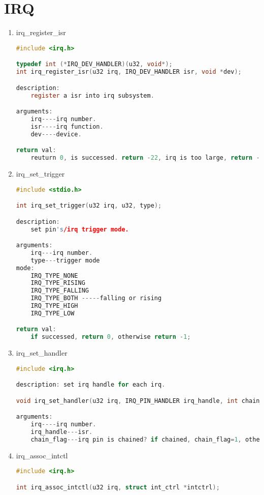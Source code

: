 \section{IRQ}
\begin{enumerate}
\item irq\_register\_isr
\begin{lstlisting}[language=c, numbers=none]
#include <irq.h>

typedef int (*IRQ_DEV_HANDLER)(u32, void*);
int irq_register_isr(u32 irq, IRQ_DEV_HANDLER isr, void *dev);

description:
	register a isr into irq subsystem.

arguments:
	irq----irq number.
	isr----irq function.
	dev----device.

return val:
	reuturn 0, is successed. return -22, irq is too large, return -12, is no memory.
\end{lstlisting}

\item irq\_set\_trigger
\begin{lstlisting}[language=c, numbers=none]
#include <stdio.h>

int irq_set_trigger(u32 irq, u32, type);

description:
	set pin's/irq trigger mode.

arguments:
	irq---irq number.
	type---trigger mode
mode:
	IRQ_TYPE_NONE
	IRQ_TYPE_RISING
	IRQ_TYPE_FALLING
	IRQ_TYPE_BOTH -----falling or rising
	IRQ_TYPE_HIGH
	IRQ_TYPE_LOW

return val:
	if successed, return 0, otherwise return -1;
\end{lstlisting}

\item irq\_set\_handler
\begin{lstlisting}[language=c, numbers=none]
#include <irq.h>

description: set irq handle for each irq.

void irq_set_handler(u32 irq, IRQ_PIN_HANDLER irq_handle, int chain_flag);

arguments:
	irq----irq number.
	irq_handle---isr.
	chain_flag---irq pin is chained? if chained, chain_flag=1, otherwise chain_flag=0.
\end{lstlisting}

\item irq\_assoc\_intctl
\begin{lstlisting}[language=c, numbers=none]
#include <irq.h>

int irq_assoc_intctl(u32 irq, struct int_ctrl *intctrl);


\end{lstlisting}
\end{enumerate}
